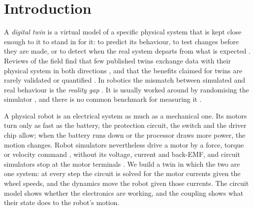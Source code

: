 \documentclass[conference,a4paper]{IEEEtran}
\begin{document}
\section{Introduction}

A \emph{digital twin} is a virtual model of a specific physical system that
is kept close enough to it to stand in for it: to predict its behaviour, to
test changes before they are made, or to detect when the real system departs
from what is expected \citep{grieves2017digital,tao2019digital}. Reviews of
the field find that few published twins exchange data with their physical
system in both directions \citep{kritzinger2018digital}, and that the
benefits claimed for twins are rarely validated or quantified
\citep{jones2020characterising}. In robotics the mismatch between simulated
and real behaviour is the \emph{reality gap}
\citep{jakobi1995noise,koos2013transferability}. It is usually worked around
by randomising the simulator \citep{tobin2017domain,peng2018sim}, and there
is no common benchmark for measuring it \citep{muratore2022robot}.

A physical robot is an electrical system as much as a mechanical one. Its
motors turn only as fast as the battery, the protection circuit, the switch
and the driver chip allow; when the battery runs down or the processor draws
more power, the motion changes. Robot simulators nevertheless drive a motor
by a force, torque or velocity command \citep{koenig2004design,todorov2012mujoco},
without its voltage, current and back-EMF, and circuit simulators stop at the motor terminals \citep{nagel1973spice}. We
build a twin in which the two are one system: at every step the circuit is
solved for the motor currents given the wheel speeds, and the dynamics move
the robot given those currents. The circuit model shows whether the
electronics are working, and the coupling shows what their state does to the
robot's motion.
\end{document}
